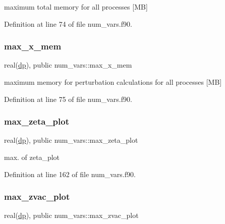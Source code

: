 maximum total memory for all processes \mbox{[}MB\mbox{]} 



Definition at line 74 of file num\+\_\+vars.\+f90.

\mbox{\label{namespacenum__vars_af86827817455d27248f5660c3d616283}} 
\subsubsection{\texorpdfstring{max\+\_\+x\+\_\+mem}{max\_x\_mem}}
{\footnotesize\ttfamily real(\hyperlink{namespacenum__vars_a03802aa2bd86439d7a9370836fabf3f2}{dp}), public num\+\_\+vars\+::max\+\_\+x\+\_\+mem}



maximum memory for perturbation calculations for all processes \mbox{[}MB\mbox{]} 



Definition at line 75 of file num\+\_\+vars.\+f90.

\mbox{\label{namespacenum__vars_a2c2f75ebac91c6e5e122e41a62b71b6d}} 
\subsubsection{\texorpdfstring{max\+\_\+zeta\+\_\+plot}{max\_zeta\_plot}}
{\footnotesize\ttfamily real(\hyperlink{namespacenum__vars_a03802aa2bd86439d7a9370836fabf3f2}{dp}), public num\+\_\+vars\+::max\+\_\+zeta\+\_\+plot}



max. of {\ttfamily zeta\+\_\+plot} 



Definition at line 162 of file num\+\_\+vars.\+f90.

\mbox{\label{namespacenum__vars_a6057251380bbdf0bf71cee48c49ab84c}} 
\subsubsection{\texorpdfstring{max\+\_\+zvac\+\_\+plot}{max\_zvac\_plot}}
{\footnotesize\ttfamily real(\hyperlink{namespacenum__vars_a03802aa2bd86439d7a9370836fabf3f2}{dp}), public num\+\_\+vars\+::max\+\_\+zvac\+\_\+plot}



